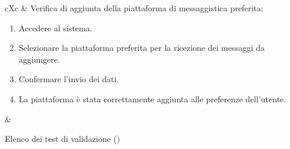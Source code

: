 \begin{table}[H]
\begin{VTtable}[1.7]{\textwidth}{cXc}
        \addtotv & Verifica di aggiunta della piattaforma di messaggistica preferita:
        \begin{enumerate}
            \item Accedere al sistema.
            \item Selezionare la piattaforma preferita per la ricezione dei messaggi da aggiungere.
            \item Confermare l'invio dei dati.
            \item La piattaforma è stata correttamente aggiunta alle preferenze dell'utente.
        \end{enumerate}
        & \TNI \\
        \bottomrule
	\end{VTtable}
	\caption{Elenco dei test di validazione (\thetableCounter)}
\end{table}

